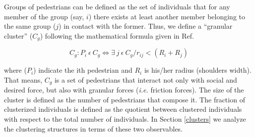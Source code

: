 Groups of pedestrians can be defined as the set of individuals that for any member of the group (say, $i$) there exists at least another member belonging to the same group ($j$) in contact with the former. Thus, we define a ``granular cluster'' ($C_g$) following the mathematical formula given in Ref.~\cite{Dorso1}

\begin{equation}
C_g:P_i~\epsilon~ C_g \Leftrightarrow \exists~ j~\epsilon~C_g / r_{ij} < (R_i+R_j) \label{ec-cluster}
\end{equation}


where ($P_i$) indicate the ith pedestrian and $R_i$ is his/her radius (shoulders width). That means, $C_g$ is a
set of pedestrians that interact not only with social and desired force, but also with granular forces (\textit{i.e.} friction forces).
The size of the cluster is defined as the number of pedestrians that compose it. The fraction of clusterized individuals is defined as the quotient between clustered individuals with respect to the total number of individuals. In Section \ref{clusters} we analyze the clustering structures in terms of these two observables. 